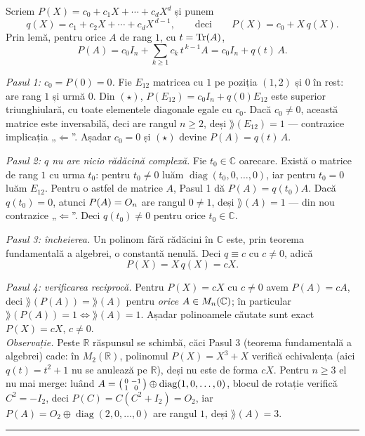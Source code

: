 \sol Scriem $P(X)=c_0+c_1X+\cdots+c_dX^d$ și punem
\[ q(X)=c_1+c_2X+\cdots+c_dX^{\,d-1},\qquad\text{deci}\qquad P(X)=c_0+X\,q(X). \]
Prin lemă, pentru orice $A$ de rang $1$, cu $t=\operatorname{Tr}(A)$,
\begin{equation*}
  P(A)=c_0I_n+\sum_{k\ge1}c_k\,t^{\,k-1}A=c_0I_n+q(t)\,A. \tag{$\star$}
\end{equation*}

\emph{Pasul 1: $c_0=P(0)=0$.} Fie $E_{12}$ matricea cu $1$ pe poziția $(1,2)$ și $0$ în rest: are rang $1$ și urmă $0$. Din $(\star)$, $P(E_{12})=c_0I_n+q(0)E_{12}$ este superior triunghiulară, cu toate elementele diagonale egale cu $c_0$. Dacă $c_0\neq0$, această matrice este inversabilă, deci are rangul $n\ge2$, deși $\rang(E_{12})=1$ --- contrazice implicația „$\Leftarrow$''. Așadar $c_0=0$ și $(\star)$ devine $P(A)=q(t)\,A$.

\emph{Pasul 2: $q$ nu are nicio rădăcină complexă.} Fie $t_0\in\mathbb{C}$ oarecare. Există o matrice de rang $1$ cu urma $t_0$: pentru $t_0\neq0$ luăm $\operatorname{diag}(t_0,0,\dots,0)$, iar pentru $t_0=0$ luăm $E_{12}$. Pentru o astfel de matrice $A$, Pasul 1 dă $P(A)=q(t_0)A$. Dacă $q(t_0)=0$, atunci $P(A)=O_n$ are rangul $0\neq1$, deși $\rang(A)=1$ --- din nou contrazice „$\Leftarrow$''. Deci $q(t_0)\neq0$ pentru orice $t_0\in\mathbb{C}$.

\emph{Pasul 3: încheierea.} Un polinom fără rădăcini în $\mathbb{C}$ este, prin teorema fundamentală a algebrei, o constantă nenulă. Deci $q\equiv c$ cu $c\neq0$, adică
\[ P(X)=X\,q(X)=cX. \]

\emph{Pasul 4: verificarea reciprocă.} Pentru $P(X)=cX$ cu $c\neq0$ avem $P(A)=cA$, deci $\rang(P(A))=\rang(A)$ pentru \emph{orice} $A\in M_n(\mathbb{C})$; în particular $\rang(P(A))=1\iff\rang(A)=1$. Așadar polinoamele căutate sunt exact $P(X)=cX$, $c\neq0$.\\[2pt]
\emph{Observație.} Peste $\mathbb{R}$ răspunsul se schimbă, căci Pasul 3 (teorema fundamentală a algebrei) cade: în $M_2(\mathbb{R})$, polinomul $P(X)=X^3+X$ verifică echivalența (aici $q(t)=t^2+1$ nu se anulează pe $\mathbb{R}$), deși nu este de forma $cX$. Pentru $n\ge3$ el nu mai merge: luând $A=\begin{psmallmatrix}0&-1\\1&0\end{psmallmatrix}\oplus\operatorname{diag}(1,0,\dots,0)$, blocul de rotație verifică $C^2=-I_2$, deci $P(C)=C(C^2+I_2)=O_2$, iar $P(A)=O_2\oplus\operatorname{diag}(2,0,\dots,0)$ are rangul $1$, deși $\rang(A)=3$.
\vspace{2mm}\hrule
\vspace{2mm}

